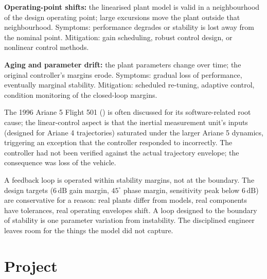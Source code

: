 \textbf{Operating-point shifts:} the linearised plant model is valid in a neighbourhood of the design operating point; large excursions move the plant outside that neighbourhood. Symptoms: performance degrades or stability is lost away from the nominal point. Mitigation: gain scheduling, robust control design, or nonlinear control methods.

\textbf{Aging and parameter drift:} the plant parameters change over time; the original controller's margins erode. Symptoms: gradual loss of performance, eventually marginal stability. Mitigation: scheduled re-tuning, adaptive control, condition monitoring of the closed-loop margins.

The 1996 Ariane 5 Flight 501 (\cite{acc:ariane501-ifr}) is often discussed for its software-related root cause; the linear-control aspect is that the inertial measurement unit's inputs (designed for Ariane 4 trajectories) saturated under the larger Ariane 5 dynamics, triggering an exception that the controller responded to incorrectly. The controller had not been verified against the actual trajectory envelope; the consequence was loss of the vehicle.

\begin{principle}
A feedback loop is operated within stability margins, not at the boundary. The design targets ($6\,\text{dB}$ gain margin, $45^\circ$ phase margin, sensitivity peak below $6\,\text{dB}$) are conservative for a reason: real plants differ from models, real components have tolerances, real operating envelopes shift. A loop designed to the boundary of stability is one parameter variation from instability. The disciplined engineer leaves room for the things the model did not capture.
\end{principle}

\section{Project}

